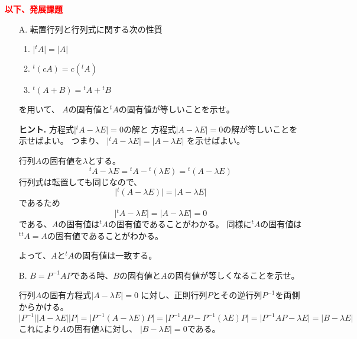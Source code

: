 \documentclass[10pt,a4paper]{ltjsarticle}
\begin{document}
\hrulefill

\textcolor{red}{\textbf{以下、発展課題}}
\begin{enumerate}
 \item[A. ] 転置行列と行列式に関する次の性質
            \begin{enumerate}
             \item $\lvert {}^{t}A\rvert = \lvert A\rvert $
             \item ${}^{t}(cA)=c({}^{t}A)$
             \item ${}^{t}(A+B) = {}^{t}A+{}^{t}B$
            \end{enumerate}
            を用いて、
            $A$の固有値と${}^{t}A$の固有値が等しいことを示せ。

            \textbf{ヒント.}
            方程式$\lvert {}^{t}A -\lambda E\rvert = 0$の解と
            方程式$\lvert A -\lambda E\rvert = 0$の解が等しいことを示せばよい。
            つまり、
            $\lvert {}^{t}A -\lambda E\rvert = \lvert A -\lambda E\rvert$
            を示せばよい。

            \dotfill

            行列$A$の固有値を$\lambda$とする。
            \begin{equation}
             {}^{t}A -\lambda E
             = {}^{t}A -{}^{t}(\lambda E)
             = {}^{t}(A -\lambda E)
            \end{equation}
            行列式は転置しても同じなので、
            \begin{equation}
             \lvert {}^{t}(A -\lambda E) \rvert
              =\lvert A -\lambda E \rvert
            \end{equation}
            であるため
            \begin{equation}
             \lvert {}^{t}A -\lambda E \rvert
              =\lvert A -\lambda E \rvert
              =0
            \end{equation}
            である、$A$の固有値は${}^{t}A$の固有値であることがわかる。
            同様に${}^{t}A$の固有値は${}^{t}{}^{t}A=A$の固有値であることがわかる。

            よって、$A$と${}^{t}A$の固有値は一致する。
            
            \hrulefill
 \item[B. ] $B=P^{-1}AP$である時、$B$の固有値と$A$の固有値が等しくなることを示せ。

            \dotfill

            行列$A$の固有方程式$\lvert A - \lambda E\rvert =0$
            に対し、正則行列$P$とその逆行列$P^{-1}$を両側からかける。
            \begin{equation}
             \lvert P^{-1}\lvert \lvert A - \lambda E\rvert \lvert P\rvert
              =\lvert P^{-1}(A - \lambda E) P\rvert
              =\lvert P^{-1}AP - P^{-1}(\lambda E) P\rvert
              =\lvert P^{-1}AP - \lambda E\rvert
              =\lvert B - \lambda E\rvert
            \end{equation}
            これにより$A$の固有値$\lambda$に対し、
            $\lvert B - \lambda E\rvert =0$である。


\end{enumerate}
\end{document}
